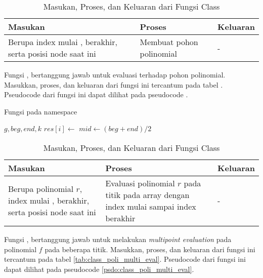 \begin{table}[]	
	\Centering
	\begin{tabular}{|p{3cm}|p{3cm}|p{3cm}|}
	\hline
	Masukan & Proses & Keluaran \\ \hline
	Berupa index mulai , berakhir, serta posisi node saat ini & Membuat pohon polinomial & - \\ \hline
	\end{tabular}
	\caption{Masukan, Proses, dan Keluaran dari Fungsi  Class }
	\label{tab:class_poli_bst}
\end{table}

\newpage

Fungsi , bertanggung jawab untuk evaluasi terhadap pohon polinomial. Masukkan, proses, dan keluaran dari fungsi ini tercantum pada tabel  . Pseudocode dari fungsi ini dapat dilihat pada pseudocode  .

\begin{algorithm}
	\caption{Fungsi  pada namespace }
	\label{psdo:class_poli_fast_eval}
	\begin{algorithmic}[1]
		\Require $ g, beg, end, k $
				\State $ res[i] \leftarrow $
			\EndFor
		\Else
			\State $ mid \leftarrow (beg + end) / 2 $
			\State {}
			\State {}
		\EndIf
	\end{algorithmic}
\end{algorithm}

\begin{table}[]	
	\Centering
	\begin{tabular}{|p{3cm}|p{3cm}|p{3cm}|}
	\hline
	Masukan & Proses & Keluaran \\ \hline
	Berupa polinomial $r$, index mulai , berakhir, serta posisi node saat ini & Evaluasi polinomial $r$ pada titik pada array dengan index mulai sampai index berakhir & - \\ \hline
	\end{tabular}
	\caption{Masukan, Proses, dan Keluaran dari Fungsi  Class }
	\label{tab:class_poli_fast_eval}
\end{table}

\newpage

Fungsi , bertanggung jawab untuk melakukan \textit{multipoint evaluation} pada polinomial $ f $ pada beberapa titik. Masukkan, proses, dan keluaran dari fungsi ini tercantum pada tabel \ref{tab:class_poli_multi_eval}. Pseudocode dari fungsi ini dapat dilihat pada pseudocode \ref{psdo:class_poli_multi_eval}.

